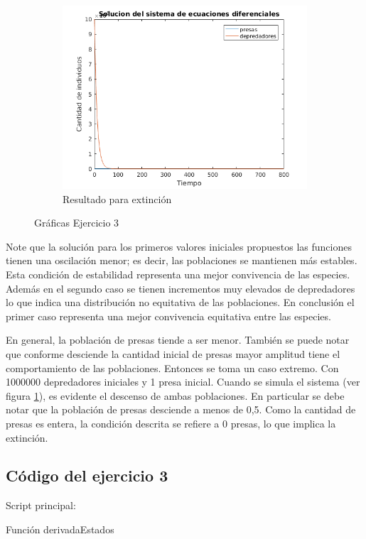 \documentclass[12pt,letterpaper]{article}
\begin{document}
\begin{figure}
\begin{subfigure}[b]{0.36\textwidth}
		\includegraphics[width=\textwidth]{pictures/ejercicio_3_extincion}
		\caption{Resultado para extinción}
		\label{fig:ejercicio_3_extincion}
	\end{subfigure}
	\caption{Gráficas Ejercicio 3}
	\label{fig:graf_ejercicio_3}
\end{figure}


Note que la solución para los primeros valores iniciales propuestos las funciones tienen una oscilación menor; es decir, las poblaciones se mantienen más estables. Esta condición de estabilidad representa una mejor convivencia de las especies. Además en el segundo caso se tienen incrementos muy elevados de depredadores lo que indica una distribución no equitativa de las poblaciones. En conclusión el primer caso representa una mejor convivencia equitativa entre las especies.

En general, la población de presas tiende a ser menor. También se puede notar que conforme desciende la cantidad inicial de presas mayor amplitud tiene el comportamiento de las poblaciones. Entonces se toma un caso extremo. Con 1000000 depredadores iniciales y 1 presa inicial. Cuando se simula el sistema (ver figura \ref{fig:ejercicio_3_extincion}), es evidente el descenso de ambas poblaciones. En particular se debe notar que la población de presas desciende a menos de 0,5. Como la cantidad de presas es entera, la condición descrita se refiere a 0 presas, lo que implica la extinción. 

\subsection{Código del ejercicio 3}
Script principal:

Función derivadaEstados

\end{document}
